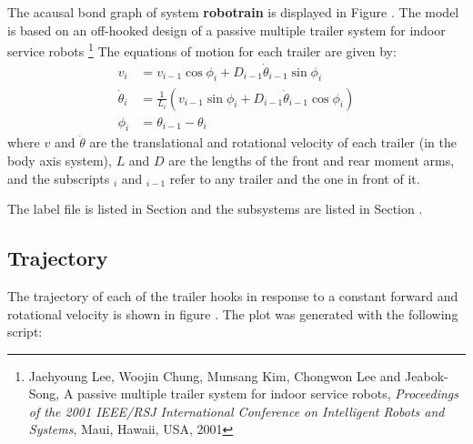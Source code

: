 
The acausal bond graph of system \textbf{robotrain} is
displayed in Figure .
The model is based on an off-hooked design of a passive multiple
trailer system for indoor service robots
\footnote{{Jaehyoung Lee, Woojin Chung, Munsang Kim, Chongwon Lee and Jeabok-Song,
    A passive multiple trailer system for indoor service robots,
    \emph{Proceedings of the 2001 IEEE/RSJ International Conference on Intelligent Robots and Systems},
    Maui, Hawaii, USA, 2001}}
The equations of motion for each trailer are given by:
\begin{align}
  v_i &= v_{i-1}\cos \phi_i+D_{i-1}\dot\theta_{i-1}\sin \phi_i\\
  \dot\theta_i &= \frac{1}{L_i}\left(v_{i-1}\sin \phi_i+D_{i-1}\dot\theta_{i-1}\cos \phi_i\right)\\
  \phi_i &= \theta_{i-1}-\theta_i
\end{align}
where $v$ and $\dot\theta$ are the translational and rotational velocity of each trailer (in the body axis system), $L$ and $D$ are the lengths of the front and rear moment arms, and the subscripts $_i$ and $_{i-1}$ refer to any trailer and the one in front of it.

The label file is listed in Section  and the
subsystems are listed in Section .

\subsection{Trajectory}
The trajectory of each of the trailer hooks in response to a constant forward and rotational velocity is shown in figure . 
The plot was generated with the following script:
\footnotesize

\normalsize

